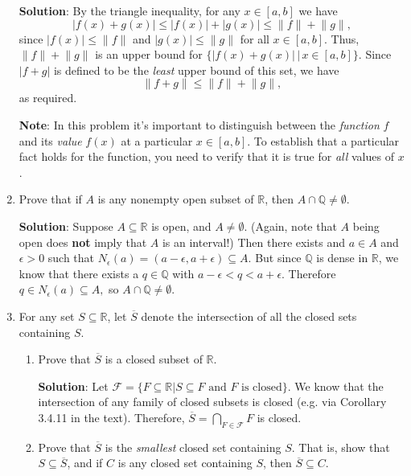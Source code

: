 \documentclass[letterpaper,12pt]{article}
\newcommand{\R}{\mathbb{R}}
\newcommand{\F}{\mathcal{F}}
\newcommand{\abs}[1]{\lvert #1\rvert}
\newcommand{\len}[1]{\lVert #1\rVert}
\begin{document}
\begin{enumerate}
\bigskip

{\bf Solution}: By the triangle inequality, for any $x\in [a,b]$ we have
\[
 \abs{f(x)+g(x)}\leq \abs{f(x)}+\abs{g(x)}\leq \len{f}+\len{g},
\]
since $\abs{f(x)}\leq \len{f}$ and $\abs{g(x)}\leq \len{g}$ for all $x\in [a,b]$. Thus, $\len{f}+\len{g}$ is an upper bound for $\{\abs{f(x)+ g(x)}\,|\, x\in[a,b]\}$. Since $\abs{f+g}$ is defined to be the {\em least} upper bound of this set, we have
\[
 \len{f+g}\leq \len{f}+\len{g},
\]
as required.

{\bf Note}: In this problem it's important to distinguish between the {\em function} $f$ and its {\em value} $f(x)$ at a particular $x\in [a,b]$. To establish that a particular fact holds for the function, you need to verify that it is true for {\em all} values of $x$.

\item Prove that if $A$ is any nonempty open subset of $\R$, then $A\cap \mathbb{Q}\neq \emptyset$.


\bigskip

{\bf Solution}: Suppose $A\subseteq \mathbb{R}$ is open, and $A \neq \emptyset$. (Again, note that $A$ being open does {\bf not} imply that $A$ is an interval!)
Then there exists and $a\in A$ and $\epsilon >0$ such that $N_{\epsilon}(a)=(a-\epsilon,a+\epsilon) \subseteq A.$
But since $\mathbb{Q}$ is dense in $\mathbb{R}$, we know that there exists a $q \in \mathbb{Q}$ with $a-\epsilon <q<a+\epsilon$.
Therefore $q \in N_{\epsilon}(a)\subseteq A,$ so $A \cap \mathbb{Q}\neq \emptyset.$



\item For any set $S\subseteq \R$, let $\overline{S}$ denote the intersection of all the closed sets containing $S$.
\begin{enumerate}
 \item Prove that $\overline{S}$ is a closed subset of $\R$.

\bigskip

{\bf Solution}: Let $\F = \{F\subseteq \R|S\subseteq F \text{ and } F \text{ is closed}\}$. We know that the intersection of any family of closed subsets is closed (e.g. via Corollary 3.4.11 in the text). Therefore, $\displaystyle \overline{S} = \bigcap_{F\in\F}F$ is closed.

 \item Prove that $\overline{S}$ is the {\em smallest} closed set containing $S$. That is, show that $S\subseteq \overline{S}$, and if $C$ is any closed set containing $S$, then $\overline{S}\subseteq C$.


\end{enumerate}
\end{enumerate}
\end{document}
